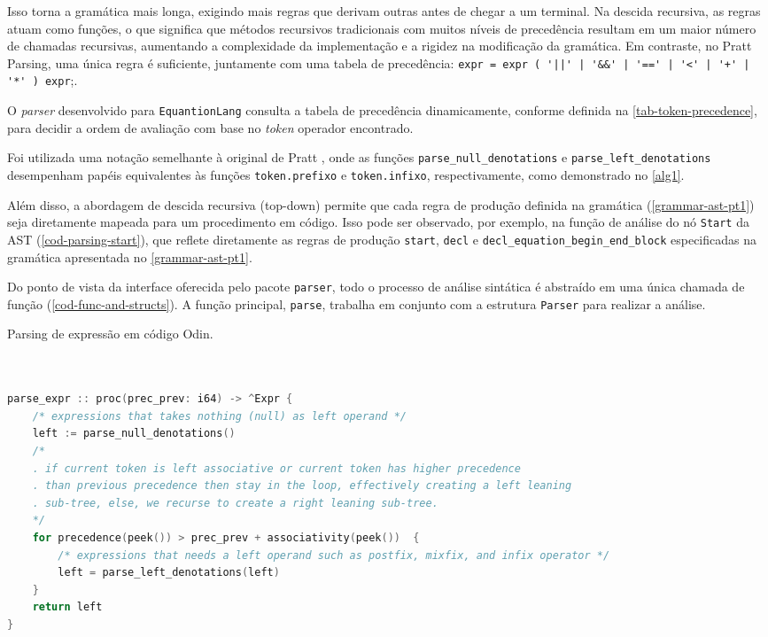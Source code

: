 Isso torna a gramática mais longa, exigindo mais regras que derivam outras antes de chegar a um terminal. Na descida recursiva, as regras atuam como funções, o que significa que métodos recursivos tradicionais com muitos níveis de precedência resultam em um maior número de chamadas recursivas, aumentando a complexidade da implementação e a rigidez na modificação da gramática. Em contraste, no Pratt Parsing, uma única regra é suficiente, juntamente com uma tabela de precedência: \verb"expr = expr ( '||' | '&&' | '==' | '<' | '+' | '*' ) expr";.

O \textit{parser} desenvolvido para \texttt{EquantionLang} consulta a tabela de precedência dinamicamente, conforme definida na \autoref{tab-token-precedence}, para decidir a ordem de avaliação com base no \textit{token} operador encontrado.


Foi utilizada uma notação semelhante à original de Pratt \cite{pratt}, onde as funções \verb"parse_null_denotations" e \verb"parse_left_denotations" desempenham papéis equivalentes às funções \texttt{token.prefixo} e \texttt{token.infixo}, respectivamente, como demonstrado no \autoref{alg1}. 

Além disso, a abordagem de descida recursiva (top-down) permite que cada regra de produção definida na gramática (\autoref{grammar-ast-pt1}) seja diretamente mapeada para um procedimento em código. Isso pode ser observado, por exemplo, na função de análise do nó \texttt{Start} da AST (\autoref{cod-parsing-start}), que reflete diretamente as regras de produção \texttt{start}, \texttt{decl} e \verb"decl_equation_begin_end_block" especificadas na gramática apresentada no \autoref{grammar-ast-pt1}.

Do ponto de vista da interface oferecida pelo pacote \texttt{parser}, todo o processo de análise sintática é abstraído em uma única chamada de função (\autoref{cod-func-and-structs}). A função principal, \texttt{parse}, trabalha em conjunto com a estrutura \texttt{Parser} para realizar a análise.

\begin{codigo}[H]
  \caption{\small Parsing de expressão em código Odin.}
        \label{alg-pratt-parsing}
  \begin{lstlisting}[language=C]


parse_expr :: proc(prec_prev: i64) -> ^Expr {
    /* expressions that takes nothing (null) as left operand */
    left := parse_null_denotations()
    /*
    . if current token is left associative or current token has higher precedence
    . than previous precedence then stay in the loop, effectively creating a left leaning
    . sub-tree, else, we recurse to create a right leaning sub-tree.
    */
    for precedence(peek()) > prec_prev + associativity(peek())  {
        /* expressions that needs a left operand such as postfix, mixfix, and infix operator */
        left = parse_left_denotations(left)
    }
    return left
}


  \end{lstlisting}
\end{codigo}


